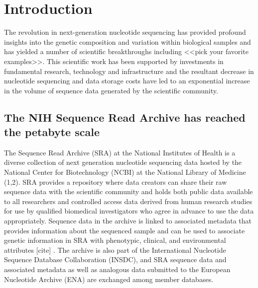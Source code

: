 \section{Introduction}
\label{sec:intro}

The revolution in next-generation nucleotide sequencing has provided profound insights into the genetic composition and variation within biological samples and has yielded a number of scientific breakthroughs including <<pick your favorite examples>>. This scientific work has been supported by investments in fundamental research, technology and infrastructure and the resultant decrease in nucleotide sequencing and data storage costs have led to an exponential increase in the volume of sequence data generated by the scientific community. 

\subsection{The NIH Sequence Read Archive has reached the petabyte scale}
\label{sec:SraGrowth}

The Sequence Read Archive (SRA) at the National Institutes of Health is a diverse collection of next generation nucleotide sequencing data hosted by the National Center for Biotechnology (NCBI) at the National Library of Medicine (1,2). SRA provides a repository where data creators can share their raw sequence data with the scientific community and holds both public data available to all researchers and controlled access data derived from human research studies for use by qualified biomedical investigators who agree in advance to use the data appropriately. Sequence data in the archive is linked to associated metadata that provides information about the sequenced sample and can be used to associate genetic information in SRA with phenotypic, clinical, and environmental attributes [cite] \cite{katz2021stat}. The archive is also part of the International Nucleotide Sequence Database Collaboration (INSDC), and SRA sequence data and associated metadata as well as analogous data submitted to the European Nucleotide Archive (ENA) are exchanged among member databases.

